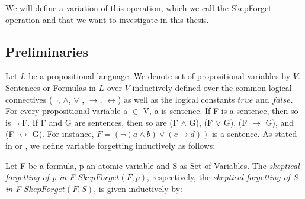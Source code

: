 We will define a variation of this operation, which we call the SkepForget operation and that we want to investigate in this thesis.\subsection{Preliminaries}
Let $L$ be a propositional language. We denote set of propositional variables by $V$. Sentences or Formulas in $L$ over $V$
inductively defined over the common logical connectives ($\neg$, $\land$, $\lor$ , $\rightarrow$, $\leftrightarrow$) as well as the logical constants $true$ and $false$.
For every propositional variable a $\in$ V, a is sentence. If F is a sentence, then so is $\neg$ F. If F and G are sentences,
then so are (F $\land$ G), (F $\lor$ G), (F $\rightarrow$ G), and (F $\leftrightarrow$ G). For instance, $F = (\neg(a \land b) \lor (c \rightarrow d))$ is a sentence.    As stated in \cite{lin1994forget} or \cite{lang2003propositional}, we define variable forgetting inductively as follows:
\begin{definition}
Let F be a formula, p an atomic variable and S as Set of Variables. The \emph{skeptical forgetting of p in F $\mathit{SkepForget}(F,p)$}, respectively, the \emph{skeptical forgetting of S in F} $\mathit{SkepForget(F,S)}$, is given inductively by:
\end{definition}
 
